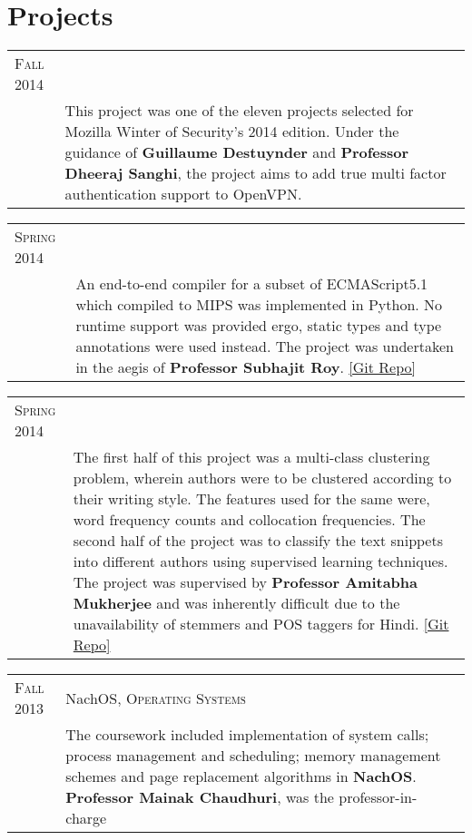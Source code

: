 \documentclass[a4paper,10pt]{article} %
\newcommand{\project}[3]{
    \begin{tabular}{>{\raggedleft}p{2.2cm}|p{17cm}}
        \textsc{#1} & \textcolor{NavyBlue}{#2} \\
                    & \footnotesize{#3} \\
    \end{tabular}
}
\begin{document}
\section{Projects}

\project {Fall 2014}
         {Multi Factor Authentication in OpenVPN, \textsc{\raggedright Mozilla Winter of Security}}
         {This project was one of the eleven projects selected for Mozilla Winter of Security's 2014 edition.
         Under the guidance of \textbf{Guillaume Destuynder} and \textbf{Professor Dheeraj Sanghi},
         the project aims to add true multi factor authentication support to OpenVPN.}

\project {Spring 2014}
         {JavaScript to MIPS Compiler, \textsc{\raggedright Compilers}}
         {An end-to-end compiler for a subset of ECMAScript5.1 which compiled to MIPS was implemented in Python.
          No runtime support was provided ergo, static types and type annotations were used instead.
          The project was undertaken in the aegis of \textbf{Professor Subhajit Roy}.
          \href{https://github.com/srijanshetty/javascript-compiler} {[Git Repo]}}

\project {Spring 2014}
         {Hindi author attribution, \textsc{\raggedright Artificial Intelligence}}
         {The first half of this project was a multi-class clustering problem,
          wherein authors were to be clustered according to their writing style.
          The features used for the same were, word frequency counts and collocation
          frequencies.  The second half of the project was to classify the text snippets
          into different authors using supervised learning techniques.
          The project was supervised by \textbf{Professor Amitabha Mukherjee} and was
          inherently difficult due to the unavailability of stemmers and POS taggers for Hindi.
          \href{https://github.com/srijanshetty/author-attribution} {[Git Repo]}}

\project {Fall 2013}
         {NachOS, \textsc{Operating Systems}}
         {The coursework included implementation of system calls; process
          management and scheduling; memory management schemes and page replacement
          algorithms in \textbf{NachOS}. \textbf{Professor Mainak Chaudhuri}, was
          the professor-in-charge}\\
\end{document}

